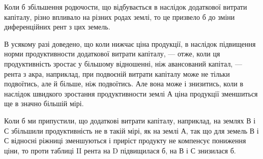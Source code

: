 Коли б збільшення родючости, що відбувається в наслідок додаткової витрати
капіталу, різно впливало на різних родах землі, то це призвело б до зміни
диференційних рент з цих земель.

В усякому разі доведено, що коли нижчає ціна продукції, в наслідок
підвищення норми продуктивности додаткової витрати капіталу, —
отже, коли ця продуктивність зростає у більшому відношенні, ніж авансований
капітал, — рента з акра, наприклад, при подвоєній витрати капіталу може не
тільки подвоїтись, але й більше, ніж подвоїтись. Але вона може і знизитись,
коли в наслідок швидкого зростання продуктивности землі А ціна продукції
зменшиться ще в значно більшій мірі.

Коли б ми припустили, що додаткові витрати капіталу, наприклад, на землях
В і С збільшили продуктивність не в такій мірі, як на землі А, так що для земель
В і С відносні ріжниці зменшуються і приріст продукту не компенсує пониження
ціни, то проти таблиці II рента на D підвищилася б, на В і С знизилася
б.
